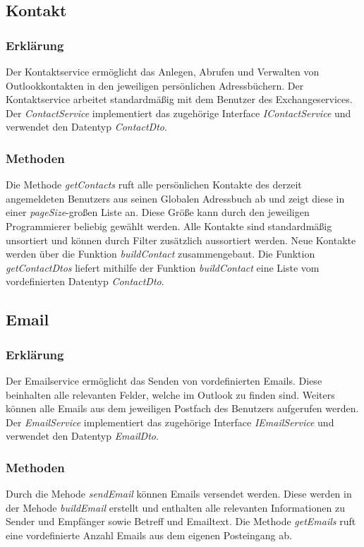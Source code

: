 \subsection{Kontakt}
\subsubsection{Erklärung}
Der Kontaktservice ermöglicht das Anlegen, Abrufen und Verwalten von Outlookkontakten in den jeweiligen persönlichen Adressbüchern. Der Kontaktservice arbeitet standardmäßig mit dem Benutzer des Exchangeservices. Der \textit{ContactService} implementiert das zugehörige Interface \textit{IContactService} und verwendet den Datentyp \textit{ContactDto}.
\subsubsection{Methoden}
Die Methode \textit{getContacts} ruft alle persönlichen Kontakte des derzeit angemeldeten Benutzers aus seinen Globalen Adressbuch ab und zeigt diese in einer \textit{pageSize}-großen Liste an. Diese Größe kann durch den jeweiligen Programmierer beliebig gewählt werden. Alle Kontakte sind standardmäßig unsortiert und können durch Filter zusätzlich aussortiert werden. Neue Kontakte werden über die Funktion \textit{buildContact} zusammengebaut. Die Funktion \textit{getContactDtos} liefert mithilfe der Funktion \textit{buildContact} eine Liste vom vordefinierten Datentyp \textit{ContactDto}. 
\subsection{Email}
\subsubsection{Erklärung}
Der Emailservice ermöglicht das Senden von vordefinierten Emails. Diese beinhalten alle relevanten Felder, welche im Outlook zu finden sind. Weiters können alle Emails aus dem jeweiligen Postfach des Benutzers aufgerufen werden. Der \textit{EmailService} implementiert das zugehörige Interface \textit{IEmailService} und verwendet den Datentyp \textit{EmailDto}.
\subsubsection{Methoden}
Durch die Mehode \textit{sendEmail} können Emails versendet werden. Diese werden in der Mehode \textit{buildEmail} erstellt und enthalten alle relevanten Informationen zu Sender und Empfänger sowie Betreff und Emailtext. Die Methode \textit{getEmails} ruft eine vordefinierte Anzahl Emails aus dem eigenen Posteingang ab. 
